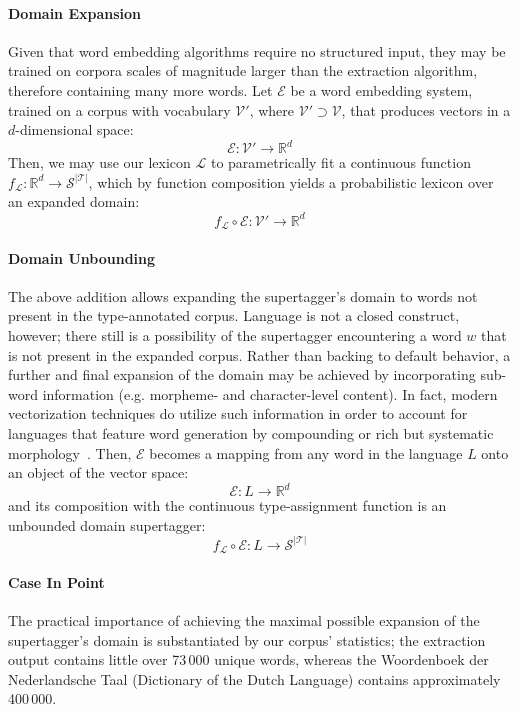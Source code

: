 \paragraph{Domain Expansion}
Given that word embedding algorithms require no structured input, they may be trained on corpora scales of magnitude larger than the extraction algorithm, therefore containing many more words.
Let $\mathcal{E}$ be a word embedding system, trained on a corpus with vocabulary $\mathcal{V}'$, where $\mathcal{V}' \supset \mathcal{V}$, that produces vectors in a $d$-dimensional space:
\[
\mathcal{E}: \mathcal{V}' \to \mathbb{R}^d
\]
Then, we may use our lexicon $\mathcal{L}$ to parametrically fit a continuous function $f_\mathcal{L}: \mathbb{R}^d \to \mathcal{S}^{|\mathcal{T}|}$, which by function composition yields a probabilistic lexicon over an expanded domain:
\[
 f_\mathcal{L} \circ \mathcal{E}: \mathcal{V}' \to \mathbb{R}^d
\]


\paragraph{Domain Unbounding}
The above addition allows expanding the supertagger's domain to words not present in the type-annotated corpus.
Language is not a closed construct, however; there still is a possibility of the supertagger encountering a word $w$ that is not present in the expanded corpus.
Rather than backing to default behavior, a further and final expansion of the domain may be achieved by incorporating sub-word information (e.g. morpheme- and character-level content).
In fact, modern vectorization techniques do utilize such information in order to account for languages that feature word generation by compounding or rich but systematic morphology~\cite{fasttext}.
Then, $\mathcal{E}$ becomes a mapping from any word in the language $L$ onto an object of the vector space:
\[
\mathcal{E}: L \to \mathbb{R}^d
\]
and its composition with the continuous type-assignment function is an unbounded domain supertagger:
\[
f_\mathcal{L} \circ \mathcal{E}: L \to \mathcal{S}^{|\mathcal{T}|}
\]

\paragraph{Case In Point}
The practical importance of achieving the maximal possible expansion of the supertagger's domain is substantiated by our corpus' statistics; the extraction output contains little over 73\,000 unique words, whereas the Woordenboek der Nederlandsche Taal (Dictionary of the Dutch Language)\cite{woordenboek} contains approximately 400\,000.


